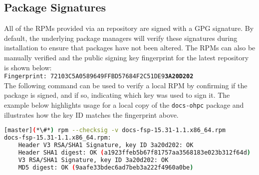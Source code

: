 \clearpage
\subsection{Package Signatures}

All of the RPMs provided via an \OHPC{} repository are signed with a GPG
signature. By default, the underlying package managers will verify these signatures during
installation to ensure that packages have not been altered. The RPMs can also
be manually verified and the public signing key fingerprint for the latest
repository is shown below: \\

\texttt{Fingerprint: 72103C5A0589649FFBD57684F2C51DE9{\bf3A20D202}} \\

\noindent The following command can be used to verify a local RPM by confirming if the package
is signed, and if so, indicating which key was used to sign it.  The example
below highlights usage for a local copy of the \texttt{docs-ohpc} package and
illustrates how the key ID matches the fingerprint above.

\begin{lstlisting}[language=bash,keywords={}]
[master](*\#*) rpm --checksig -v docs-fsp-15.31-1.1.x86_64.rpm
docs-fsp-15.31-1.1.x86_64.rpm:
    Header V3 RSA/SHA1 Signature, key ID 3a20d202: OK
    Header SHA1 digest: OK (a1923ffeb5b67f81757aa3568183e023b312f64d)
    V3 RSA/SHA1 Signature, key ID 3a20d202: OK
    MD5 digest: OK (9aafe33bdec6ad7beb3a222f4960a0be)
\end{lstlisting}




